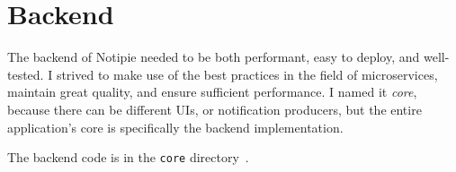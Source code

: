 \section{Backend}\label{sec:backend}

The backend of Notipie
needed to be both performant,
easy to deploy,
and well-tested.
I strived to make use of the best practices
in the field of microservices,
maintain great quality,
and ensure sufficient performance.
I named it \emph{core},
because there can be different UIs,
or notification producers,
but the entire application's core
is specifically the backend implementation.

The backend code
is in the
\texttt{core} directory~\cite{sewera_notipie_2022}.




